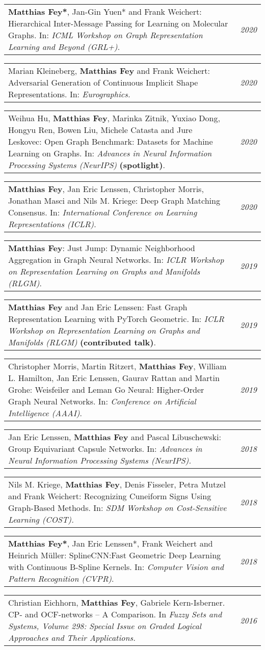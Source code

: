 \documentclass[letterpaper,11pt]{article}
\newcommand{\ressubheading}[2]{
\begin{tabularx}{\textwidth}{Xr}
  #1 & #2
\end{tabularx}
}
\begin{document}
\ressubheading{\textbf{Matthias Fey*}, Jan-Gin Yuen* and Frank Weichert: Hierarchical Inter-Message Passing for Learning on Molecular Graphs. In: \emph{ICML Workshop on Graph Representation Learning and Beyond (GRL+)}.}{\faCalendar~\emph{2020}}

\ressubheading{Marian Kleineberg, \textbf{Matthias Fey} and Frank Weichert: Adversarial Generation of Continuous Implicit Shape Representations. In: \emph{Eurographics.}}{\faCalendar~\emph{2020}}

\ressubheading{Weihua Hu, \textbf{Matthias Fey}, Marinka Zitnik, Yuxiao Dong, Hongyu Ren, Bowen Liu, Michele Catasta and Jure Leskovec: Open Graph Benchmark: Da\-ta\-sets for Machine Learning on Graphs. In: \emph{Advances in Neural Information Processing Systems (NeurIPS)} \textbf{(spotlight)}.}{\faCalendar~\emph{2020}}

\ressubheading{\textbf{Matthias Fey}, Jan Eric Lenssen, Christopher Morris, Jonathan Masci and Nils M. Kriege: Deep Graph Matching Consensus. In: \emph{International Conference on Learning Representations (ICLR)}.}{\faCalendar~\emph{2020}}

\ressubheading{\textbf{Matthias Fey}: Just Jump: Dynamic Neighborhood Aggregation in Graph Neural Networks. In: \emph{ICLR Workshop on Representation Learning on Graphs and Manifolds (RLGM)}.}{\faCalendar~\emph{2019}}

\ressubheading{\textbf{Matthias Fey} and Jan Eric Lenssen: Fast Graph Representation Learning with PyTorch Geometric. In: \emph{ICLR Workshop on Representation Learning on Graphs and Manifolds (RLGM)} \textbf{(contributed talk)}.}{\faCalendar~\emph{2019}}

\ressubheading{Christopher Morris, Martin Ritzert, \textbf{Matthias Fey}, William L. Hamilton, Jan Eric Lenssen, Gaurav Rattan and Martin Grohe: Weisfeiler and Leman Go Neural: Higher-Order Graph Neural Networks. In: \emph{Conference on Artificial Intelligence (AAAI)}.}{\faCalendar~\emph{2019}}

\ressubheading{Jan Eric Lenssen, \textbf{Matthias Fey} and Pascal Libuschewski: Group Equivariant Capsule Networks. In: \emph{Advances in Neural Information Processing Systems (NeurIPS).}}{\faCalendar~\emph{2018}}

\ressubheading{Nils M. Kriege, \textbf{Matthias Fey}, Denis Fisseler, Petra Mutzel and Frank Weichert: Recognizing Cuneiform Signs Using Graph-Based Methods. In: \emph{SDM Workshop on Cost-Sensitive Learning (COST).}}{\faCalendar~\emph{2018}}

\ressubheading{\textbf{Matthias Fey*}, Jan Eric Lenssen*, Frank Weichert and Heinrich Müller: SplineCNN:\@ Fast Geometric Deep Learning with Continuous B-Spline Kernels. In: \emph{Computer Vision and Pattern Recognition (CVPR)}.}{\faCalendar~\emph{2018}}

\ressubheading{Christian Eichhorn, \textbf{Matthias Fey}, Gabriele Kern-Isberner. CP- and OCF-networks – A Comparison. In \textit{Fuzzy Sets and Systems, Volume 298: Special Issue on Graded Logical Approaches and Their Applications.}}{\faCalendar~\emph{2016}}
\end{document}
